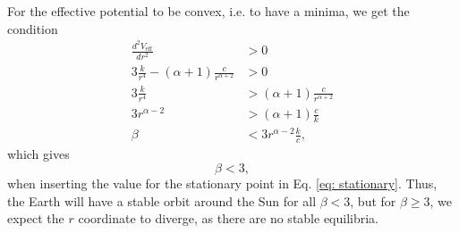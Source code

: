 \documentclass[%
 reprint,
nofootinbib,
aps,
]{revtex4-1}
\begin{document}
For the effective potential to be convex, i.e. to have a minima, we get the condition
\begin{align}
\frac{d^2V_{\mathrm{eff}}}{dr^2} &> 0\\
3\frac{k}{r^4} - (\alpha + 1)\frac{c}{r^{\alpha + 2}} &> 0\\
3\frac{k}{r^4} &> (\alpha + 1)\frac{c}{r^{\alpha + 2}}\\
3 r^{\alpha - 2} &> (\alpha + 1)\frac{c}{k}\\
\beta &< 3 r^{\alpha - 2}\frac{k}{c},
\end{align}
which gives
\begin{equation}
\beta < 3,
\end{equation}
when inserting the value for the stationary point in Eq. \eqref{eq: stationary}. Thus, the Earth will have a stable orbit around the Sun for all $\beta < 3$, but for $\beta \geq 3$, we expect the $r$ coordinate to diverge, as there are no stable equilibria.




{}

\end{document}
